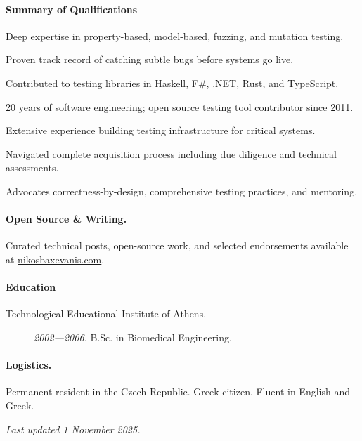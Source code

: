 \documentclass[10pt]{article}
\newenvironment{itemize*}
  {\begin{itemize}
    \setlength{\itemsep}{0.5mm}
    \setlength{\parskip}{0.5mm}}
  {\end{itemize}}
\newenvironment{myquote}
  {\list{}{\leftmargin=4.5mm\rightmargin=0cm}\item[]}
  {\endlist}
\begin{document}
\paragraph{Summary of Qualifications}
\begin{itemize*}
\item Deep expertise in property-based, model-based, fuzzing, and mutation
  testing.
\item Proven track record of catching subtle bugs before systems go live.
\item Contributed to testing libraries in Haskell, F\#, .NET, Rust, and
  TypeScript.
\item 20 years of software engineering; open source testing tool contributor
  since 2011.
\item Extensive experience building testing infrastructure for critical
  systems.
\item Navigated complete acquisition process including due diligence and
  technical assessments.
\item Advocates correctness-by-design, comprehensive testing practices, and
  mentoring.
\end{itemize*}

\paragraph{Open Source \& Writing.}
Curated technical posts, open-source work, and selected endorsements available at
\href{https://nikosbaxevanis.com}{nikosbaxevanis.com}.

\paragraph{Education}
\begin{myquote}
\begin{description}
\item[Technological Educational Institute of Athens.]
  \emph{2002—2006.} B.Sc. in Biomedical Engineering.
\end{description}
\end{myquote}

\paragraph{Logistics.}
Permanent resident in the Czech Republic. Greek citizen. Fluent in English and
Greek.

\bigskip\noindent\emph{Last updated 1 November 2025.}
\end{document}
